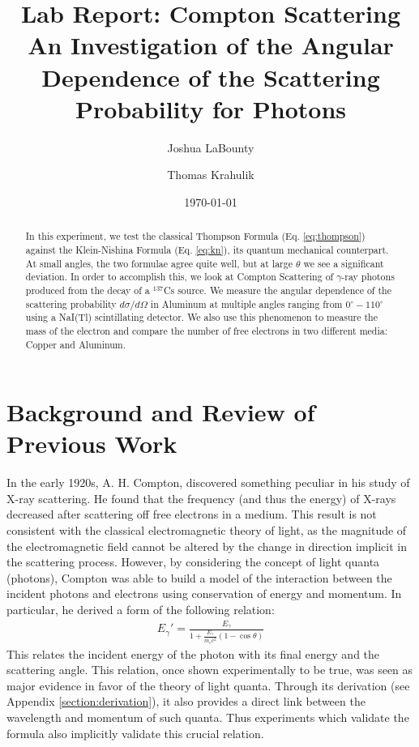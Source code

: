 \documentclass[%
 reprint,
 amsmath,amssymb,
 aps,
 pra,
]{revtex4-1}
\begin{document}

\title{\textbf{Lab Report: Compton Scattering} \\ \small{An Investigation of the Angular Dependence of the Scattering Probability for Photons}}
\author{Joshua LaBounty}
\author{Thomas Krahulik}

\date{\today}

\begin{abstract}
	In this experiment, we test the classical Thompson Formula (Eq. \ref{eq:thompson}) against the Klein-Nishina Formula (Eq. \ref{eq:kn}), its quantum mechanical counterpart. At small angles, the two formulae agree quite well, but at large $\theta$ we see a significant deviation. In order to accomplish this, we look at Compton Scattering of $\gamma$-ray photons produced from the decay of a $^{137}$Cs source. We measure the angular dependence of the scattering probability $d\sigma / d\Omega$ in Aluminum at multiple angles ranging from $0^\circ - 110^\circ$ using a NaI(Tl) scintillating detector. We also use this phenomenon to measure the mass of the electron and compare the number of free electrons in two different media: Copper and Aluminum.
\end{abstract}
\maketitle

\section{Background and Review of Previous Work}

In the early 1920s, A. H. Compton, discovered something peculiar in his study of X-ray scattering. He found that the frequency (and thus the energy) of X-rays decreased after scattering off free electrons in a medium. This result is not consistent with the classical electromagnetic theory of light, as the magnitude of the electromagnetic field cannot be altered by the change in direction implicit in the scattering process. However, by considering the concept of light quanta (photons), Compton was able to build a model of the interaction between the incident photons and electrons using conservation of energy and momentum. In particular, he derived a form of the following relation:
\begin{gather}\label{eq:energy_scatter}
	E_\gamma ' = \frac{E_\gamma}{1 + \frac{E_\gamma}{m_e c^2} (1 - \cos{\theta})}
\end{gather}
This relates the incident energy of the photon with its final energy and the scattering angle. This relation, once shown experimentally to be true, was seen as major evidence in favor of the theory of light quanta. Through its derivation (see Appendix \ref{section:derivation}), it also provides a direct link between the wavelength and momentum of such quanta. Thus experiments which validate the formula also implicitly validate this crucial relation.
\end{document}
